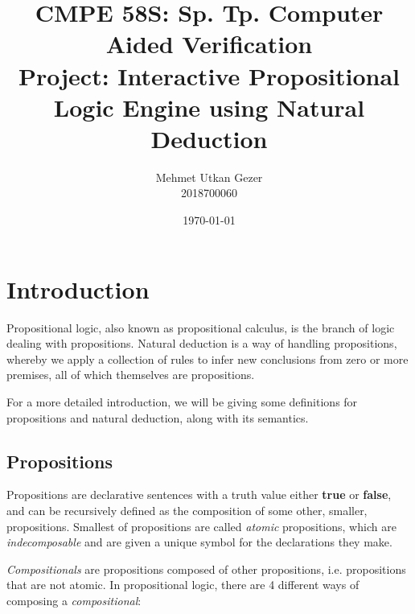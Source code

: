 \documentclass{article}
\title{CMPE 58S: Sp. Tp. Computer Aided Verification \\ Project: Interactive Propositional Logic Engine using Natural Deduction}
\date{\today{}}
\author{Mehmet Utkan Gezer \\ 2018700060}
\newcommand{\true}{\textbf{true}}
\newcommand{\false}{\textbf{false}}
\begin{document}
\maketitle

\section{Introduction}

Propositional logic, also known as propositional calculus, is the branch
of logic dealing with propositions. Natural deduction is a way of handling
propositions, whereby we apply a collection of rules to infer new
conclusions from zero or more premises, all of which themselves are
propositions.

For a more detailed introduction, we will be giving some definitions for
propositions and natural deduction, along with its semantics.

\subsection{Propositions}

Propositions are declarative
sentences with a truth value either \true{} or \false{},
and can be recursively defined as the composition of
some other, smaller, propositions. Smallest of propositions are
called \textit{atomic} propositions, which are \textit{indecomposable}
and are given a unique symbol for the declarations they make.

\textit{Compositionals} are propositions composed of other propositions,
i.e. propositions that are not atomic. In propositional logic, there
are 4 different ways of composing a \textit{compositional}:
\end{document}
